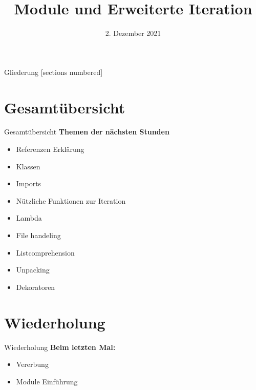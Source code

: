 



\title{Module und Erweiterte Iteration}
\date{2. Dezember 2021}


	
\maketitle

\begin{frame}{Gliederung}
	[sections numbered]
	\tableofcontents
\end{frame}

\section*{Gesamtübersicht}
\begin{frame}{Gesamtübersicht}
	\textbf{Themen der nächsten Stunden}
	\begin{itemize}
		\item Referenzen Erklärung
		\item  Klassen
		\item \alert{Imports}
		\item \alert{Nützliche Funktionen zur Iteration}
		\item Lambda
		\item File handeling
		\item Listcomprehension
		\item Unpacking
		\item Dekoratoren
	\end{itemize}
\end{frame}

\section{Wiederholung}
\begin{frame}{Wiederholung}
	\textbf{Beim letzten Mal:}
	\begin{itemize}
		\item Vererbung
		
		\item Module Einführung
		
		\pause
	\end{itemize}

		
\end{frame}

